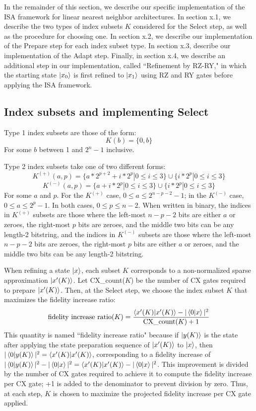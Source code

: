 \documentclass{article}
\begin{document}
In the remainder of this
section, we describe our specific implementation of the ISA framework for linear
nearest neighbor architectures. In section x.1, we describe the two types of
index subsets $K$ considered for the Select step, as well as the procedure for
choosing one. In section x.2, we describe our implementation of the Prepare step
for each index subset type. In section x.3, describe our implementation of the
Adapt step. Finally, in section x.4, we describe an additional step in our 
implementation, 
called ``Refinement by RZ-RY," in which the starting state $\mathinner{|{x_0}\rangle}$ is first
refined to $\mathinner{|{x_1}\rangle}$ using RZ and RY gates before applying the ISA framework.

\subsection{Index subsets and implementing Select}
Type 1 index subsets are those of the form:
$$K(b) = \{0, b\}$$
For some $b$ between 1 and $2^n - 1$ inclusive.

Type 2 index subsets take one of two different forms:
$$K^{(+)}(a, p) = \{a * 2^{p + 2} + i * 2^p | 0 \leq i \leq 3\} \cup \{i * 2^p | 0 \leq i \leq 3\}$$
$$K^{(-)}(a, p) = \{a + i * 2^p | 0 \leq i \leq 3\} \cup \{i * 2^p | 0 \leq i \leq 3\}$$
For some $a$ and $p$. For the $K^{(+)}$ case, $0 \leq a \leq 2^{n - p - 2} - 1$;
in the $K^{(-)}$ case, $0 \leq a \leq 2^p - 1$. In both cases, $0 \leq p \leq n - 2$.
When written in binary, the indices in $K^{(+)}$ subsets are those where the
left-most $n - p - 2$ bits are either $a$ or zeroes, the right-most $p$ bits are
zeroes, and the middle two bits can be any length-2 bitstring, and the indices 
in $K^{(-)}$ subsets are those where the left-most $n - p - 2$ bits are zeroes,
the right-most $p$ bits are either $a$ or zeroes, and the middle two bits can be
any length-2 bitstring. 

When refining a state $\mathinner{|{x}\rangle}$, each subset $K$ corresponds to a non-normalized
sparse approximation $\mathinner{|{x'(K)}\rangle}$. Let CX\_count($K$) be the number of CX gates
required to prepare $\mathinner{|{x'(K)}\rangle}$. Then, at the Select step, we choose the index
subset $K$ that maximizes the fidelity increase ratio:
$$\text{fidelity increase ratio}(K) = \frac{\mathinner{\langle{x'(K)|x'(K)}\rangle} 
- |\mathinner{\langle{0|x}\rangle}|^2}{\text{CX\_count}(K) + 1}$$
This quantity is named ``fidelity increase ratio" because if $\mathinner{|{y(K)}\rangle}$ is the
state after applying the state preparation sequence of $\mathinner{|{x'(K)}\rangle}$ to 
$\mathinner{|{x}\rangle}$, then $|\mathinner{\langle{0|y(K)}\rangle}|^2 = \mathinner{\langle{x'(K)|x'(K)}\rangle}$, corresponding to a
fidelity increase of $|\mathinner{\langle{0|y(K)}\rangle}|^2 - |\mathinner{\langle{0|x}\rangle}|^2 
= \mathinner{\langle{x'(K)|x'(K)}\rangle} - |\mathinner{\langle{0|x}\rangle}|^2$. This improvement is divided by the 
number of CX gates required to achieve it to compute the fidelity increase per
CX gate; +1 is added to the denominator to prevent division by zero. Thus, at
each step, $K$ is chosen to maximize the projected fidelity increase per CX
gate applied.
\end{document}
